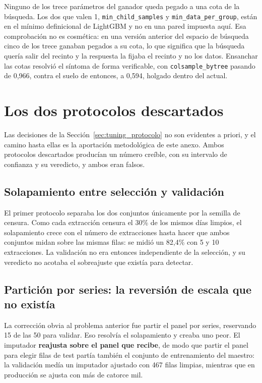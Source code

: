 Ninguno de los trece parámetros del ganador queda pegado a una cota de la búsqueda. Los dos que
valen 1, \texttt{min\_child\_samples} y \texttt{min\_data\_per\_group}, están en el mínimo
definicional de LightGBM y no en una pared impuesta aquí. Esa comprobación no es cosmética: en
una versión anterior del espacio de búsqueda cinco de los trece ganaban pegados a su cota, lo que
significa que la búsqueda quería salir del recinto y la respuesta la fijaba el recinto y no los
datos. Ensanchar las cotas resolvió el síntoma de forma verificable, con
\texttt{colsample\_bytree} pasando de 0{,}966, contra el suelo de entonces, a 0{,}594, holgado
dentro del actual.

\section{Los dos protocolos descartados}
\label{sec:tuning_descartados}

Las decisiones de la Sección~\ref{sec:tuning_protocolo} no son evidentes a priori, y el camino
hasta ellas es la aportación metodológica de este anexo. Ambos protocolos descartados producían
un número creíble, con su intervalo de confianza y su veredicto, y ambos eran falsos.

\subsection*{Solapamiento entre selección y validación}

El primer protocolo separaba los dos conjuntos únicamente por la semilla de censura. Como cada
extracción censura el 30\% de los mismos días limpios, el solapamiento crece con el número de
extracciones hasta hacer que ambos conjuntos midan sobre las mismas filas: se midió un 82{,}4\%
con 5 y 10 extracciones. La validación no era entonces independiente de la selección, y su
veredicto no acotaba el sobreajuste que existía para detectar.

\subsection*{Partición por series: la reversión de escala que no existía}

La corrección obvia al problema anterior fue partir el panel por series, reservando 15 de las 50
para validar. Eso resolvía el solapamiento y creaba uno peor. El imputador \textbf{reajusta sobre
el panel que recibe}, de modo que partir el panel para elegir filas de test partía también el
conjunto de entrenamiento del maestro: la validación medía un imputador ajustado con 467 filas
limpias, mientras que en producción se ajusta con más de catorce mil.

